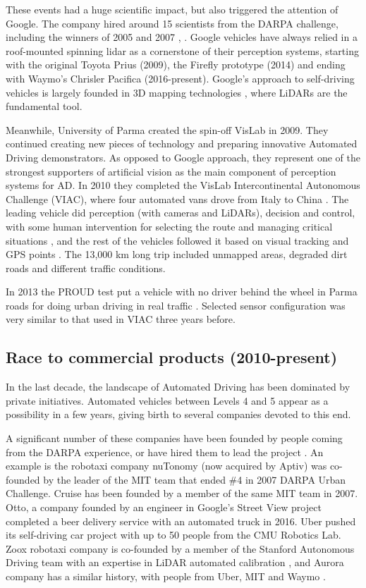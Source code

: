 These events had a huge scientific impact, but also triggered the attention of 
Google. The company hired around 15 scientists from the DARPA challenge, 
including the winners of 2005 and 2007 \cite{Montemerlo2008}, 
\cite{Levinson2011}. Google vehicles have always relied in a roof-mounted 
spinning lidar as a cornerstone of their perception systems, starting with the 
original Toyota Prius (2009), the Firefly prototype (2014) and ending with 
Waymo's Chrisler Pacifica (2016-present).
Google's approach to self-driving vehicles is largely founded in 3D mapping technologies \cite{Chapell2016}, where LiDARs are the fundamental tool.

Meanwhile, University of Parma created the spin-off VisLab in 2009. They 
continued creating new pieces of technology and preparing innovative Automated 
Driving demonstrators. As opposed to Google approach, they represent one of the 
strongest supporters of artificial vision as the main component of perception 
systems for AD. In 2010 they completed the VisLab Intercontinental Autonomous 
Challenge (VIAC), where four automated vans drove from Italy to China 
\cite{Bertozzi2011}.
The leading vehicle did perception (with cameras and LiDARs), decision and 
control, with some human intervention for selecting the route and managing 
critical situations \cite{Broggi2012}, and the rest of the vehicles followed 
it based on visual tracking and GPS points \cite{Broggi2012a}. The 13,000 km 
long trip included unmapped areas, degraded dirt roads and different traffic 
conditions. 

In 2013 the PROUD test put a vehicle with no driver behind the wheel in Parma 
roads for doing urban driving in real traffic \cite{Broggi2013}. 
Selected sensor configuration was very similar to that used in VIAC three years
before.
 
\subsection{Race to commercial products (2010-present)}
 
In the last decade, the landscape of Automated Driving has been dominated by private initiatives. Automated vehicles between Levels 4 and 5 appear as a possibility in a few years, giving birth to several companies devoted to this end. 

A significant number of these companies have been founded by people coming from 
the DARPA experience, or have hired them to lead the project 
\cite{Chapell2016}. An example is the robotaxi company nuTonomy (now acquired 
by Aptiv) was co-founded by the leader of the MIT team that ended \#4 in 2007 
DARPA Urban Challenge. Cruise has been founded by a member of the same MIT team 
in 2007.
Otto, a company founded by an engineer in Google's 
Street View project completed a beer delivery service with an automated truck in 2016.
Uber pushed its self-driving car project with up to 50 people from the CMU 
Robotics Lab. Zoox robotaxi company is co-founded by a member of the Stanford 
Autonomous Driving team with an expertise in LiDAR automated calibration 
\cite{Levinson2011a}, and Aurora company has a similar history, with people from Uber, MIT and Waymo \cite{Anderson2013}.

